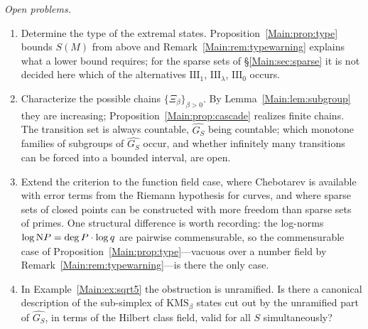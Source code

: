 \emph{Open problems.}
\begin{enumerate}
\item Determine the type of the extremal states. Proposition~\ref{Main:prop:type} bounds $S(M)$
from above and Remark~\ref{Main:rem:typewarning} explains what a lower bound requires; for the
sparse sets of \S\ref{Main:sec:sparse} it is not decided here which of the alternatives
$\mathrm{III}_1$, $\mathrm{III}_\lambda$, $\mathrm{III}_0$ occurs.
\item Characterize the possible chains $\{\Xi_\beta\}_{\beta>0}$. By
Lemma~\ref{Main:lem:subgroup} they are increasing; Proposition~\ref{Main:prop:cascade} realizes
finite chains. The transition set is always countable, $\widehat{G_S}$ being countable;
which monotone families of subgroups of $\widehat{G_S}$ occur, and whether infinitely many
transitions can be forced into a bounded interval, are open.
\item Extend the criterion to the function field case, where Chebotarev is
available with error terms from the Riemann hypothesis for curves, and where
sparse sets of closed points can be constructed with more freedom than sparse
sets of primes. One structural difference is worth recording: the log-norms
$\log\mathrm{N} P=\deg P\cdot\log q$ are pairwise commensurable, so the commensurable case of
Proposition~\ref{Main:prop:type}---vacuous over a number field by
Remark~\ref{Main:rem:typewarning}---is there the only case.
\item In Example~\ref{Main:ex:sqrt5} the obstruction is unramified. Is there a
canonical description of the sub-simplex of $\mathrm{KMS}_\beta$ states cut out
by the unramified part of $\widehat{G_S}$, in terms of the Hilbert class field,
valid for all $S$ simultaneously?
\end{enumerate}

